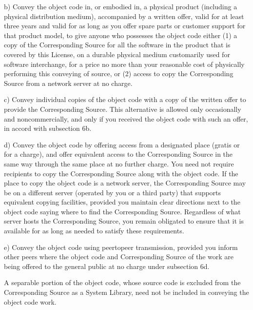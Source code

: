 \documentclass[letterpaper,10pt,english]{sphinxmanual}
\begin{document}
\begin{sphinxVerbatim}[commandchars=\\\{\}]
   b) Convey the object code in, or embodied in, a physical product (including
      a physical distribution medium), accompanied by a written offer, valid
      for at least three years and valid for as long as you offer spare parts
      or customer support for that product model, to give anyone who possesses
      the object code either (1) a copy of the Corresponding Source for all the
      software in the product that is covered by this License, on a durable
      physical medium customarily used for software interchange, for a price no
      more than your reasonable cost of physically performing this conveying of
      source, or (2) access to copy the Corresponding Source from a network
      server at no charge.

   c) Convey individual copies of the object code with a copy of the written
      offer to provide the Corresponding Source. This alternative is allowed
      only occasionally and noncommercially, and only if you received the
      object code with such an offer, in accord with subsection 6b.

   d) Convey the object code by offering access from a designated place (gratis
      or for a charge), and offer equivalent access to the Corresponding Source
      in the same way through the same place at no further charge. You need not
      require recipients to copy the Corresponding Source along with the object
      code. If the place to copy the object code is a network server, the
      Corresponding Source may be on a different server (operated by you or a
      third party) that supports equivalent copying facilities, provided you
      maintain clear directions next to the object code saying where to find
      the Corresponding Source. Regardless of what server hosts the
      Corresponding Source, you remain obligated to ensure that it is available
      for as long as needed to satisfy these requirements.

   e) Convey the object code using peer\PYGZhy{}to\PYGZhy{}peer transmission, provided you
      inform other peers where the object code and Corresponding Source of the
      work are being offered to the general public at no charge under
      subsection 6d.

   A separable portion of the object code, whose source code is excluded from
   the Corresponding Source as a System Library, need not be included in
   conveying the object code work.


\end{sphinxVerbatim}
\end{document}
